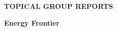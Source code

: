

  \vfill

\begin{center}
\begin{Huge}   {\bf  TOPICAL GROUP REPORTS}

\bigskip

\bigskip

 {\bf Energy  Frontier }

\vfill

\vfill

\end{Huge}
\end{center}

\newpage
\thispagestyle{empty}
\mbox{\null}


